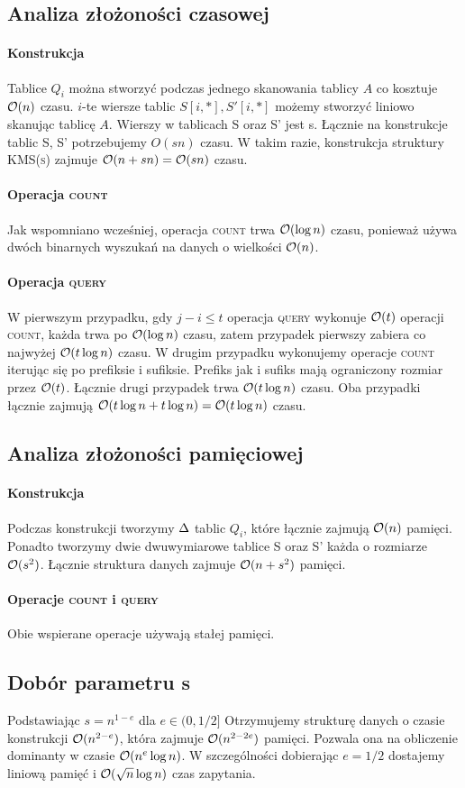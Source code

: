 \subsection{Analiza złożoności czasowej}
\paragraph{Konstrukcja} Tablice $Q_i$ można stworzyć podczas jednego skanowania tablicy $A$ co kosztuje $\mathcal{O}(n)$ czasu. $i$-te wiersze tablic $S[i,*], S'[i,*]$ możemy stworzyć liniowo skanując tablicę $A$. Wierszy w tablicach S oraz S' jest s. Łącznie na konstrukcje tablic S, S' potrzebujemy $O(sn)$ czasu. W takim razie, konstrukcja struktury \textsc{KMS(s)} zajmuje $\mathcal{O}(n + sn) = \mathcal{O}(sn)$ czasu.
\paragraph{Operacja \textsc{count}} Jak wspomniano wcześniej, operacja \textsc{count} trwa $\mathcal{O}(\log n)$ czasu, ponieważ używa dwóch binarnych wyszukań na danych o wielkości $\mathcal{O}(n)$.
\paragraph{Operacja \textsc{query}} W pierwszym przypadku, gdy $j-i \le t$ operacja \textsc{query} wykonuje $\mathcal{O}(t)$ operacji \textsc{count}, każda trwa po $\mathcal{O}(\log n)$ czasu, zatem przypadek pierwszy zabiera co najwyżej $\mathcal{O}(t \log n)$ czasu. W drugim przypadku wykonujemy operacje \textsc{count} iterując się po prefiksie i sufiksie. Prefiks jak i sufiks mają ograniczony rozmiar przez $\mathcal{O}(t)$. Łącznie drugi przypadek trwa $\mathcal{O}(t \log n)$ czasu. Oba przypadki łącznie zajmują $\mathcal{O}(t \log n + t \log n) = \mathcal{O}(t \log n)$ czasu.
\subsection{Analiza złożoności pamięciowej}
\paragraph{Konstrukcja} Podczas konstrukcji tworzymy $\Delta$ tablic $Q_i$, które łącznie zajmują $\mathcal{O}(n)$ pamięci. Ponadto tworzymy dwie dwuwymiarowe tablice S oraz S' każda o rozmiarze $\mathcal{O}(s^2)$. Łącznie struktura danych zajmuje $\mathcal{O}(n + s^2)$ pamięci.\paragraph{Operacje \textsc{count} i \textsc{query}} Obie wspierane operacje używają stałej pamięci.

\subsection{Dobór parametru s}
Podstawiając $s=n^{1-e}$ dla $e \in (0, 1/2]$ Otrzymujemy strukturę danych o czasie konstrukcji $\mathcal{O}(n^{2-e})$, która zajmuje $\mathcal{O}(n^{2-2e})$ pamięci. Pozwala ona na obliczenie dominanty w czasie $\mathcal{O}(n^e \log n)$. W szczególności dobierając $e=1/2$ dostajemy liniową pamięć i $\mathcal{O}(\sqrt{n} \log n)$ czas zapytania.

\newpage